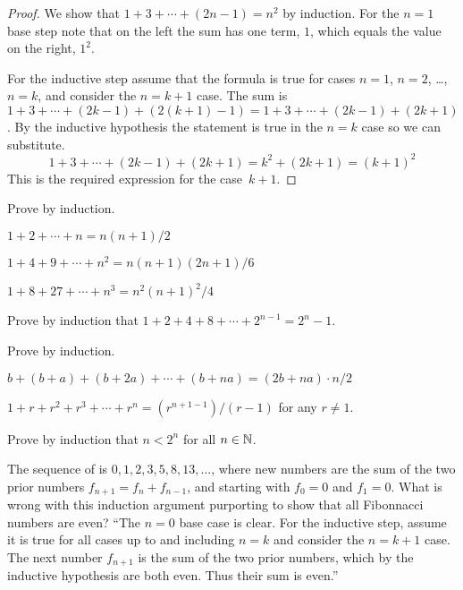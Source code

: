\documentclass{ibl}
\begin{document}
\begin{proof}
  We show that $1+3+\cdots+(2n-1)=n^2$ by induction.
  For the $n=1$ base step note that on the left the sum has one term, $1$,
  which equals the value on the right, $1^2$.

  For the inductive step assume that the 
  formula is true for cases $n=1$, $n=2$, \ldots, $n=k$, and 
  consider the $n=k+1$ case.
  The sum is $1+3+\cdots+(2k-1)+(2(k+1)-1)=1+3+\cdots+(2k-1)+(2k+1)$.
  By the inductive hypothesis the statement is true in the $n=k$ case
  so we can substitute.
  \begin{equation*}
    1+3+\cdots+(2k-1)+(2k+1)=k^2+(2k+1)=(k+1)^2
  \end{equation*}
  This is the required expression for the case~$k+1$.
\end{proof}

\begin{ex}
Prove by induction.
\begin{exes}
\item $1+2+\cdots+n=n(n+1)/2$
\item $1+4+9+\cdots+n^2=n(n+1)(2n+1)/6$
\item $1+8+27+\cdots+n^3=n^2(n+1)^2/4$
\end{exes}
\end{ex}

\begin{ex}
Prove by induction that
$1+2+4+8+\cdots+2^{n-1}=2^n-1$.  
\end{ex}

\begin{ex}
Prove by induction.
\begin{exes}
  \item {}
       $b+(b+a)+(b+2a)+\cdots+(b+na)=(2b+na)\cdot n/2$
  \item {}
        $1+r+r^2+r^3+\cdots+r^n=(r^{n+1-1})/(r-1)$ for any $r\neq 1$.
\end{exes}
\end{ex}

\begin{ex}
Prove by induction that $n<2^n$ for all $n\in\mathbb{N}$.  
\end{ex}

\begin{ex}
The sequence of  is
$0,1,2,3,5,8,13, \ldots$, where new numbers are the sum of the 
two prior numbers $f_{n+1}=f_n+f_{n-1}$, and starting with $f_0=0$ and $f_1=0$.
What is wrong with this induction argument purporting to show that
all Fibonnacci numbers are even?
``The $n=0$ base case is clear.  For the inductive step, assume it is 
true for all cases up to and including $n=k$ and consider the $n=k+1$ case.
The next number $f_{n+1}$ is the sum of the two prior numbers, which by
the inductive hypothesis are both even.  
Thus their sum is even.''   
\end{ex}
\end{document}
